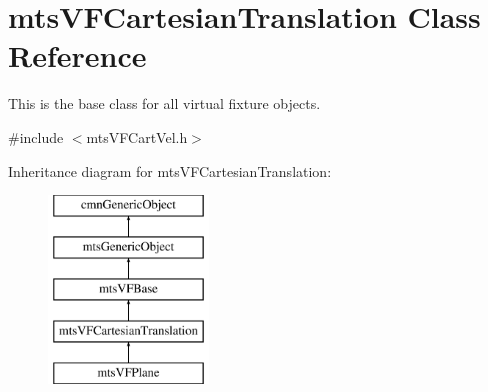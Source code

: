 \hypertarget{classmts_v_f_cartesian_translation}{\section{mts\-V\-F\-Cartesian\-Translation Class Reference}
\label{classmts_v_f_cartesian_translation}
}


This is the base class for all virtual fixture objects.  




{\ttfamily \#include $<$mts\-V\-F\-Cart\-Vel.\-h$>$}

Inheritance diagram for mts\-V\-F\-Cartesian\-Translation\-:\begin{figure}[H]
\begin{center}
\leavevmode
\includegraphics[height=5.000000cm]{d7/d59/classmts_v_f_cartesian_translation}
\end{center}
\end{figure}
